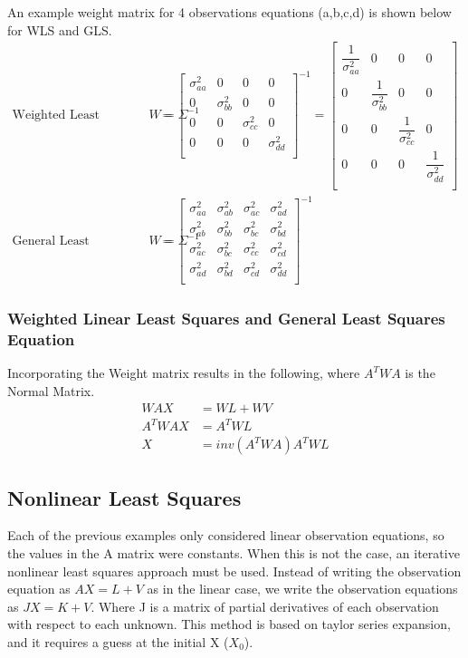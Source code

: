 An example weight matrix for 4 observations equations (a,b,c,d) is shown below for WLS and GLS.
\begin{align*}
\text{Weighted Least Squares(WLS) } W = \Sigma^{-1} &= 
\begin{bmatrix}
\sigma_{aa}^2 & 0 & 0 & 0 \\ 
0 & \sigma_{bb}^2 & 0 & 0 \\
0 & 0 & \sigma_{cc}^2 & 0 \\
0 & 0 & 0 & \sigma_{dd}^2 \\
\end{bmatrix}
^{-1}
=
\begin{bmatrix}
\dfrac{1}{\sigma_{aa}^2} & 0 & 0 & 0 \\ 
0 & \dfrac{1}{\sigma_{bb}^2} & 0 & 0 \\
0 & 0 & \dfrac{1}{\sigma_{cc}^2} & 0 \\
0 & 0 & 0 & \dfrac{1}{\sigma_{dd}^2} \\
\end{bmatrix}
\\
\text{General Least Squares(WLS) } W = \Sigma^{-1} &= 
\begin{bmatrix}
\sigma_{aa}^2 & \sigma_{ab}^2 & \sigma_{ac}^2 & \sigma_{ad}^2 \\ 
\sigma_{ab}^2 & \sigma_{bb}^2 & \sigma_{bc}^2 & \sigma_{bd}^2 \\ 
\sigma_{ac}^2 & \sigma_{bc}^2 & \sigma_{cc}^2 & \sigma_{cd}^2 \\ 
\sigma_{ad}^2 & \sigma_{bd}^2 & \sigma_{cd}^2 & \sigma_{dd}^2 \\ 
\end{bmatrix}
^{-1}
\end{align*}
\subsubsection*{Weighted Linear Least Squares and General Least Squares Equation}
Incorporating the Weight matrix results in the following, where $A^TWA$ is the Normal Matrix.
\begin{align*}
WAX &= WL + WV \\
A^TWAX &= A^TWL \\
X &= inv(A^TWA)A^TWL
\end{align*}

\subsection{Nonlinear Least Squares}
Each of the previous examples only considered linear observation equations, so the values in the A matrix were constants.  When this is not the case, an iterative nonlinear least squares approach must be used.  Instead of writing the observation equation as $AX=L+V$ as in the linear case, we write the observation equations as $JX=K+V$. Where J is a matrix of partial derivatives of each observation with respect to each unknown.  This method is based on taylor series expansion, and it requires a guess at the initial X ($X_0$).  

